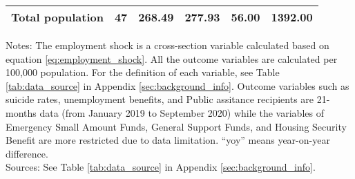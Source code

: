 \begin{table}
\begin{threeparttable}
\begin{tabular}[t]{lrrrrr}
\hspace{1em}Total population & 47 & \num{268.49} & \num{277.93} & \num{56.00} & \num{1392.00}\\
\bottomrule
\end{tabular}
\begin{tablenotes}
\small
\item [] \parbox[t]{\textwidth}{Notes: The employment shock is a cross-section variable calculated based on equation \eqref{eq:employment_shock}. All the outcome variables are calculated per 100,000 population. For the definition of each variable, see Table \ref{tab:data_source} in Appendix \ref{sec:background_info}. Outcome variables such as suicide rates, unemployment benefits, and Public assitance recipients are 21-months data (from January 2019 to September 2020) while the variables of Emergency Small Amount Funds, General Support Funds, and Housing Security Benefit are more restricted due to data limitation. ``yoy'' means year-on-year difference. \\
Sources: See Table \ref{tab:data_source} in Appendix \ref{sec:background_info}.}
\end{tablenotes}
\end{threeparttable}
\end{table}
